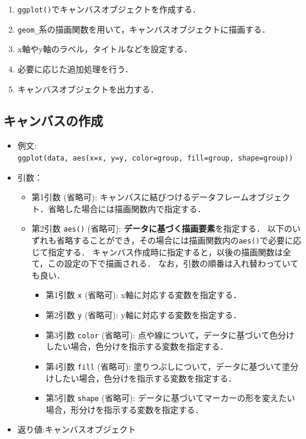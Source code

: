 \documentclass[
  xelatex, ja=standard]{bxjsarticle}
\providecommand{\tightlist}{%
  \setlength{\itemsep}{0pt}\setlength{\parskip}{0pt}}
\begin{document}
\begin{enumerate}
\def\labelenumi{\arabic{enumi}.}
\tightlist
\item
  \texttt{ggplot()}でキャンバスオブジェクトを作成する．
\item
  \texttt{geom\_}系の描画関数を用いて，キャンバスオブジェクトに描画する．
\item
  x軸やy軸のラベル，タイトルなどを設定する．
\item
  必要に応じた追加処理を行う．
\item
  キャンバスオブジェクトを出力する．
\end{enumerate}

\subsection{キャンバスの作成}\label{ux30adux30e3ux30f3ux30d0ux30b9ux306eux4f5cux6210}

\begin{itemize}
\tightlist
\item
  例文:
  \texttt{ggplot(data,\ aes(x=x,\ y=y,\ color=group,\ fill=group,\ shape=group))}
\item
  引数：

  \begin{itemize}
  \tightlist
  \item
    第1引数 (省略可):
    キャンバスに結びつけるデータフレームオブジェクト．省略した場合には描画関数内で指定する．
  \item
    第2引数 \texttt{aes()} (省略可):
    \textbf{データに基づく描画要素}を指定する．
    以下のいずれも省略することができ，その場合には描画関数内の\texttt{aes()}で必要に応じて指定する．
    キャンバス作成時に指定すると，以後の描画関数は全て，この設定の下で描画される．
    なお，引数の順番は入れ替わっていても良い．

    \begin{itemize}
    \tightlist
    \item
      第1引数 \texttt{x} (省略可): x軸に対応する変数を指定する．
    \item
      第2引数 \texttt{y} (省略可): y軸に対応する変数を指定する．
    \item
      第3引数 \texttt{color} (省略可):
      点や線について，データに基づいて色分けしたい場合，色分けを指示する変数を指定する．
    \item
      第4引数 \texttt{fill} (省略可):
      塗りつぶしについて，データに基づいて塗分けしたい場合，色分けを指示する変数を指定する．
    \item
      第5引数 \texttt{shape} (省略可):
      データに基づいてマーカーの形を変えたい場合，形分けを指示する変数を指定する．
    \end{itemize}
  \end{itemize}
\item
  返り値:キャンバスオブジェクト
\end{itemize}
\end{document}
